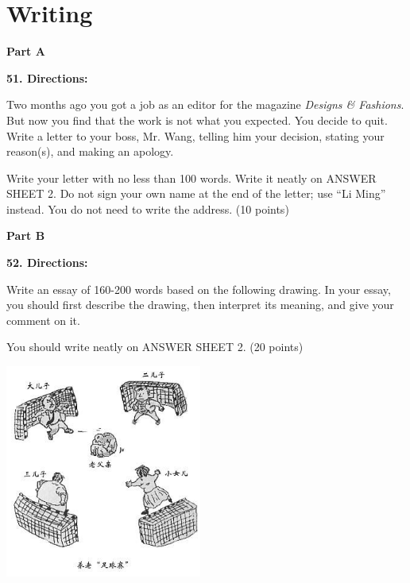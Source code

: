 \section{Writing}
\textbf{Part A}

\textbf{51. Directions:}

\qquad Two months ago you got a job as an editor for the magazine \emph{Designs \& Fashions}. But now you find that the work is not what you expected. You decide to quit. Write a letter to your boss, Mr. Wang, telling him your decision, stating your reason(s), and making an apology.

\qquad Write your letter with no less than 100 words. Write it neatly on ANSWER SHEET 2. Do not sign your own name at the end of the letter; use ``Li Ming'' instead. You do not need to write the address. (10 points)

\vspace{10pt}

\textbf{Part B}

\textbf{52. Directions:}

\qquad Write an essay of 160-200 words based on the following drawing. In your essay, you should first describe the drawing, then interpret its meaning, and give your comment on it.

\qquad You should write neatly on ANSWER SHEET 2. (20 points)

\begin{center}\includegraphics[height=7cm]{8.jpg}\end{center}